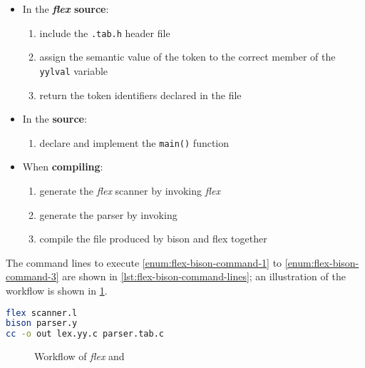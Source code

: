 \begin{itemize}
  \item In the \textbf{\textit{flex} source}:
        \begin{enumerate}[series=flex-bison-enum, label=step \arabic*., ref=(step \arabic*), leftmargin=*, labelindent=2em, widest*=6]
          \item include the \texttt{.tab.h} header file
          \item assign the semantic value of the token to the correct member of the \texttt{yylval} variable
          \item return the token identifiers declared in the \bison file
        \end{enumerate}
  \item In the \textbf{\bison source}:
        \begin{enumerate}[resume*=flex-bison-enum]
          \item declare and implement the \texttt{main()} function
        \end{enumerate}
  \item When \textbf{compiling}:
        \begin{enumerate}[resume*=flex-bison-enum]
          \item\label{enum:flex-bison-command-1} generate the \textit{flex} scanner by invoking \textit{flex}
          \item\label{enum:flex-bison-command-2} generate the \bison parser by invoking \bison
          \item\label{enum:flex-bison-command-3} compile the \clang file produced by bison and flex together
        \end{enumerate}
\end{itemize}

The command lines to execute \ref{enum:flex-bison-command-1} to \ref{enum:flex-bison-command-3} are shown in \ref{lst:flex-bison-command-lines}; an illustration of the workflow is shown in \ref{fig:flex-bison-workflow}.

\begin{onepage}
  \begin{lstlisting}[language=bash, caption={Command lines to execute \ref{enum:flex-bison-command-1} to \ref{enum:flex-bison-command-3}}, label={lst:flex-bison-command-lines}]
flex scanner.l
bison parser.y
cc -o out lex.yy.c parser.tab.c
\end{lstlisting}
\end{onepage}

\begin{figure}[htbp]
  \centering
  \bigskip
  \caption{Workflow of \textit{flex} and \bison}
  \label{fig:flex-bison-workflow}
  \bigskip
\end{figure}

